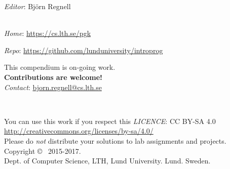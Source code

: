 
\clearpage\null\thispagestyle{empty}
\vfill

{
\setlength{\parindent}{0pt}
\emph{Editor}: Björn Regnell \\


\\ \newline

\emph{Home}: \url{https://cs.lth.se/pgk} \newline

\emph{Repo}: \url{https://github.com/lunduniversity/introprog} \\ \newline

This compendium is on-going work. \\ \textbf{Contributions are welcome!} \\
\emph{Contact}: \url{bjorn.regnell@cs.lth.se}
\\ \newline


~\\ \newline

You can use this work if you respect this \emph{LICENCE}: CC BY-SA 4.0 \\
\url{http://creativecommons.org/licenses/by-sa/4.0/} \\
Please do \emph{not} distribute your solutions to lab assignments and projects.
\\ \newline
Copyright \copyright~ 2015-2017. \\
Dept. of Computer Science, LTH, Lund University. Lund. Sweden.\\
}
